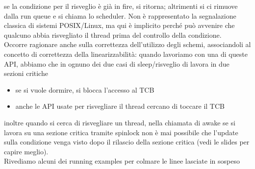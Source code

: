 \documentclass[12pt, oneside]{extbook}
\begin{document}
se la condizione per il risveglio è già in fire, si ritorna; altrimenti si ci rimuove dalla run queue e si chiama lo scheduler. Non è rappresentato la segnalazione classica di sistemi POSIX/Linux, ma qui è implicito perché può avvenire che qualcuno abbia risvegliato il thread prima del controllo della condizione.\\ Occorre ragionare anche sulla correttezza dell'utilizzo degli schemi, associandoli al concetto di correttezza della linearizzabilità: quando lavoriamo con una di queste API, abbiamo che in ognuno dei due casi di sleep/risveglio di lavora in due sezioni critiche
\begin{itemize}
\item se si vuole dormire, si blocca l'accesso al TCB
\item anche le API usate per risvegliare il thread cercano di toccare il TCB
\end{itemize}
inoltre quando si cerca di risvegliare un thread, nella chiamata di awake se si lavora su una sezione critica tramite spinlock non è mai possibile che l'update sulla condizione venga visto dopo il rilascio della sezione critica (vedi le slides per capire meglio).\\Rivediamo alcuni dei running examples per colmare le linee lasciate in sospeso
\end{document}
